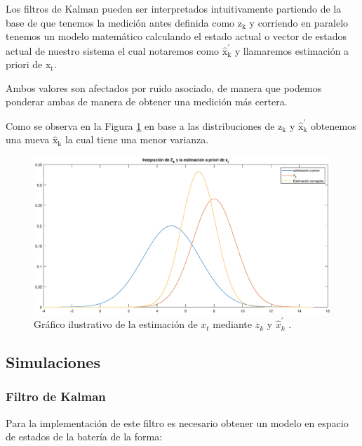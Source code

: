 \documentclass[10pt,a4paper]{article}
\begin{document}
	
    \noindent Los filtros de Kalman pueden ser interpretados intuitivamente 
    partiendo de la base de que tenemos la medición antes definida como 
    $\mathrm{z_k}$ y corriendo en paralelo tenemos un modelo matemático 
    calculando el estado actual o vector de estados actual de nuestro sistema el 
    cual notaremos como $\mathrm{\hat{x}^\prime_k}$ y llamaremos estimación a 
    priori de $\mathrm{x_{t}}$.
	
	\noindent Ambos valores son afectados por ruido asociado, de manera que 
    podemos ponderar ambas de manera de obtener una medición más certera.
	
	\noindent Como se observa en la Figura \ref{KF_Integration_concept} en base 
    a las distribuciones de $\mathrm{z_k}$ y $\mathrm{\hat{x}^\prime_k}$ 
    obtenemos una nueva $\mathrm{\hat{x}_k}$ la cual tiene una menor varianza.
	
	\begin{figure}[h!]
		\begin{center}
			\includegraphics[width=1\textwidth]{KF_Integration_concept.eps}
			\caption{Gráfico ilustrativo de la estimación de $x_{t}$ mediante $z_k$ y $\hat{x}^\prime_k$ .}
			\label{KF_Integration_concept}
		\end{center}
	\end{figure}
	
	\clearpage
	
	\subsection{Simulaciones}

	\subsubsection{Filtro de Kalman}

	\noindent Para la implementación de este filtro es necesario obtener un 
    modelo en espacio de estados de la batería de la forma:
	
\end{document}
